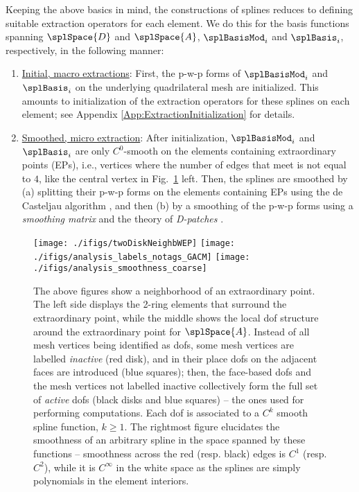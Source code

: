 \documentclass[11pt]{article}
\begin{document}
Keeping the above basics in mind, the constructions of splines reduces to defining suitable extraction operators for each element. We do this for the basis functions spanning $\splSpace{D}$ and $\splSpace{A}$, $\splBasisMod_i$ and $\splBasis_i$, respectively, in the following manner:
\begin{enumerate}[label=(\alph*)]
	\item \underline{Initial, macro extractions}:
	First, the p-w-p forms of $\splBasisMod_i$ and $\splBasis_i$ on the underlying quadrilateral mesh are initialized. 
	This amounts to initialization of the extraction operators for these splines on each element; see Appendix \ref{App:ExtractionInitialization} for details.
	\item \underline{Smoothed, micro extraction}:
	After initialization, $\splBasisMod_i$ and $\splBasis_i$ are only $C^0$-smooth on the elements containing extraordinary points (EPs), i.e., vertices where the number of edges that meet is not equal to $4$, like the central vertex in Fig.~\ref{fig:splineDOFConfig} left. 
	Then, the splines are smoothed by (a) splitting their p-w-p forms on the elements containing EPs \citep{nguyen2016refinable} using the de Casteljau algorithm \citep{piegl2012nurbs}, and then (b) by a smoothing of the p-w-p forms using a \emph{smoothing matrix} and the theory of \emph{D-patches} \citep{reif1997refineable}.
\end{enumerate}
\begin{figure}[h]
	\centering
	\texttt{[image: ./ifigs/twoDiskNeighbWEP]}\hspace{0.5cm}
	\texttt{[image: ./ifigs/analysis\_labels\_notags\_GACM]}\hspace{0.5cm}
	\texttt{[image: ./ifigs/analysis\_smoothness\_coarse]}
	\caption{The above figures show a neighborhood of an extraordinary point. The left side displays the 2-ring elements that surround the extraordinary point, while the middle shows the local dof structure around the extraordinary point for $\splSpace{A}$. Instead of all mesh vertices being identified as dofs, some mesh vertices are labelled \emph{inactive} (red disk), and in their place dofs on the adjacent faces are introduced (blue squares); then, the face-based dofs and the mesh vertices not labelled inactive collectively form the full set of \emph{active} dofs (black disks and blue squares) -- the ones used for performing computations. Each dof is associated to a $C^k$ smooth spline function, $k \geq 1$. The rightmost figure elucidates the smoothness of an arbitrary spline in the space spanned by these functions -- smoothness across the red (resp. black) edges is $C^1$ (resp. $C^2$), while it is $C^\infty$ in the white space as the splines are simply polynomials in the element interiors.}
	\label{fig:splineDOFConfig}
\end{figure}
\end{document}
